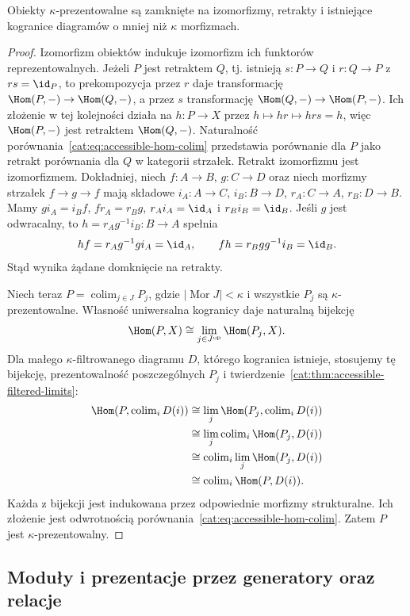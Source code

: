 \begin{stwierdzenie}\label{cat:prop:accessible-presentable-closure}
Obiekty $\kappa$-prezentowalne są zamknięte na izomorfizmy, retrakty i istniejące kogranice diagramów o mniej niż $\kappa$ morfizmach.
\end{stwierdzenie}
\begin{proof}
Izomorfizm obiektów indukuje izomorfizm ich funktorów reprezentowalnych. Jeżeli $P$ jest retraktem $Q$, tj. istnieją $s:P\to Q$ i $r:Q\to P$ z $rs=\id_P$, to prekompozycja przez $r$ daje transformację $\Hom(P,-)\to\Hom(Q,-)$, a przez $s$ transformację $\Hom(Q,-)\to\Hom(P,-)$. Ich złożenie w tej kolejności działa na $h:P\to X$ przez $h\mapsto hr\mapsto hrs=h$, więc $\Hom(P,-)$ jest retraktem $\Hom(Q,-)$. Naturalność porównania~\eqref{cat:eq:accessible-hom-colim} przedstawia porównanie dla $P$ jako retrakt porównania dla $Q$ w kategorii strzałek. Retrakt izomorfizmu jest izomorfizmem. Dokładniej, niech $f:A\to B$, $g:C\to D$ oraz niech morfizmy strzałek $f\to g\to f$ mają składowe $i_A:A\to C$, $i_B:B\to D$, $r_A:C\to A$, $r_B:D\to B$. Mamy $gi_A=i_Bf$, $fr_A=r_Bg$, $r_Ai_A=\id_A$ i $r_Bi_B=\id_B$. Jeśli $g$ jest odwracalny, to $h=r_Ag^{-1}i_B:B\to A$ spełnia
\[
 hf=r_Ag^{-1}gi_A=\id_A,\qquad
 fh=r_Bgg^{-1}i_B=\id_B.
\]
Stąd wynika żądane domknięcie na retrakty.

Niech teraz $P=\operatorname{colim}_{j\in J}P_j$, gdzie $|\operatorname{Mor}J|<\kappa$ i wszystkie $P_j$ są $\kappa$-prezentowalne. Własność uniwersalna kogranicy daje naturalną bijekcję
\[
 \Hom(P,X)\cong\lim_{j\in J^{\mathrm{op}}}\Hom(P_j,X).
\]
Dla małego $\kappa$-filtrowanego diagramu $D$, którego kogranica istnieje, stosujemy tę bijekcję, prezentowalność poszczególnych $P_j$ i twierdzenie~\ref{cat:thm:accessible-filtered-limits}:
\[
\begin{aligned}
 \Hom(P,\operatorname{colim}_iD(i))
 &\cong\lim_j\Hom(P_j,\operatorname{colim}_iD(i))\\
 &\cong\lim_j\operatorname{colim}_i\Hom(P_j,D(i))\\
 &\cong\operatorname{colim}_i\lim_j\Hom(P_j,D(i))\\
 &\cong\operatorname{colim}_i\Hom(P,D(i)).
\end{aligned}
\]
Każda z bijekcji jest indukowana przez odpowiednie morfizmy strukturalne. Ich złożenie jest odwrotnością porównania~\eqref{cat:eq:accessible-hom-colim}. Zatem $P$ jest $\kappa$-prezentowalny.
\end{proof}

\subsection{Moduły i prezentacje przez generatory oraz relacje}

